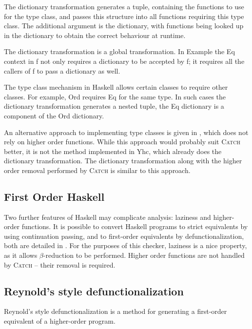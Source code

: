 \documentclass[preprint]{sigplanconf}
\let\cite=\citep
\newcommand{\C}[1]{\textsf{#1}}
\newcommand{\catch}{\textsc{Catch}}
\newcounter{exmp}
\newcommand{\lastexample}{\arabic{exmp}}
\begin{document}
The dictionary transformation generates a tuple, containing the functions to use for the type class, and passes this structure into all functions requiring this type class. The additional argument is the dictionary, with functions being looked up in the dictionary to obtain the correct behaviour at runtime.

The dictionary transformation is a global transformation. In Example \lastexample{} the \C{Eq} context in \C{f} not only requires a dictionary to be accepted by \C{f}; it requires all the callers of \C{f} to pass a dictionary as well.

The type class mechanism in Haskell allows certain classes to require other classes. For example, \C{Ord} requires \C{Eq} for the same type. In such cases the dictionary transformation generates a nested tuple, the \C{Eq} dictionary is a component of the \C{Ord} dictionary.

An alternative approach to implementing type classes is given in \cite{jones:dictionary_free}, which does not rely on higher order functions. While this approach would probably suit \catch{} better, it is not the method implemented in Yhc, which already does the dictionary transformation. The dictionary transformation along with the higher order removal performed by \catch{} is similar to this approach.

\subsection{First Order Haskell}

Two further features of Haskell may complicate analysis: laziness and higher-order functions. It is possible to convert Haskell programs to strict equivalents by using continuation passing, and to first-order equivalents by defunctionalization, both are detailed in \citet{reynolds:defunc}. For the purposes of this checker, laziness is a nice property, as it allows $\beta$-reduction to be performed. Higher order functions are not handled by \catch{} -- their removal is required.

\subsection{Reynold's style defunctionalization}

Reynold's style defunctionalization \citep{reynolds:defunc} is a method for generating a first-order equivalent of a higher-order program.
\end{document}
